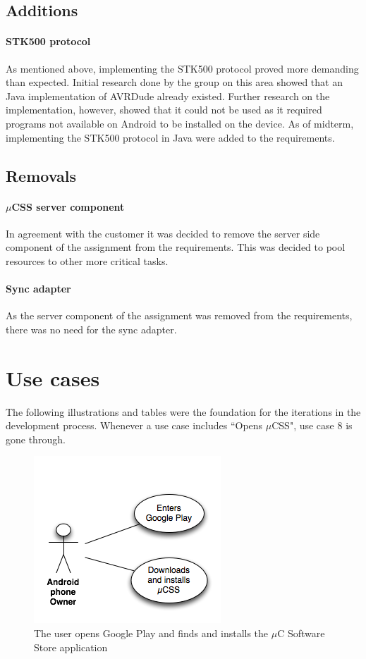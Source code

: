 \subsection{Additions}
\paragraph{STK500 protocol} As mentioned above, implementing the STK500 protocol proved more demanding than expected. Initial research done by the group on this area showed that an Java implementation of AVRDude already existed. Further research on the implementation, however, showed that it could not be used as it required programs not available on Android to be installed on the device. As of midterm, implementing the STK500 protocol in Java were added to the requirements.

\subsection{Removals}
\paragraph{$\mu$CSS server component} In agreement with the customer it was decided to remove the server side component of the assignment from the requirements. This was decided to pool resources to other more critical tasks.

\paragraph{Sync adapter} As the server component of the assignment was removed from the requirements, there was no need for the sync adapter.

\section{Use cases}
\label{usecases}
The following illustrations and tables were the foundation for the iterations in the development process. Whenever a use case includes ``Opens $\mu$CSS", use case 8 is gone through. 

\begin{figure}[H]
\centering
\includegraphics[scale=0.7]{images/UseCase1}
\caption[Yse case 1]{The user opens Google Play and finds and installs the $\mu$C Software Store application}
\end{figure}

